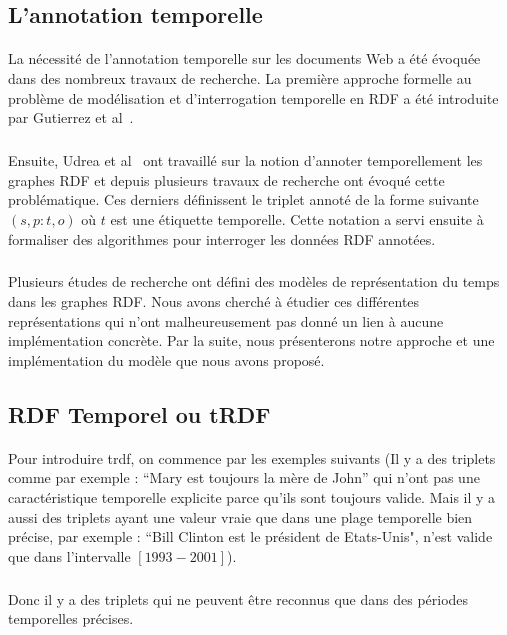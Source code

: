 \subsection{L'annotation temporelle}
\paragraph{}
La nécessité de l’annotation temporelle sur les documents Web a été évoquée dans des nombreux travaux de recherche. La première approche formelle au problème de modélisation et d’interrogation temporelle en RDF a été introduite par Gutierrez et al~\cite{gutierrez2005}.
\subparagraph{}
Ensuite, Udrea et al~\cite{udrea2006} ont travaillé sur la notion d'annoter temporellement les graphes RDF et depuis plusieurs travaux de recherche ont évoqué cette problématique.
Ces derniers définissent le triplet annoté de la forme suivante $(s,p:t,o)$ où $t$ est une étiquette temporelle. Cette notation a servi ensuite à formaliser des algorithmes pour interroger les données RDF annotées.
\subparagraph{}	
Plusieurs études de recherche ont défini des modèles de représentation du temps dans les graphes RDF. Nous avons cherché à étudier ces différentes représentations qui n'ont malheureusement pas donné un lien à aucune implémentation concrète. Par la suite, nous présenterons notre approche et une implémentation du modèle que nous avons proposé.  
\subsection{RDF Temporel ou tRDF}
\paragraph{}
Pour introduire \gls{trdf}, on commence par les exemples suivants (Il y a des triplets comme par exemple : ``Mary est toujours la mère de John'' qui n'ont pas une caractéristique temporelle explicite parce qu’ils sont toujours valide. Mais il y a aussi des triplets ayant une valeur vraie que dans une plage temporelle bien précise, par exemple : ``Bill Clinton est le président de Etats-Unis", n'est valide que dans l'intervalle $[1993-2001]$).
\subparagraph{}
Donc il y a des triplets qui ne peuvent être reconnus que dans des périodes temporelles précises.
